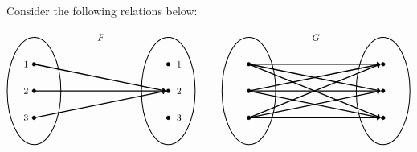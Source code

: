 \documentclass[12pt,letterpaper]{exam}
\begin{document}
\examtitle
{} 
\scores
\bottomline
\newpage

\begin{questions}

\newpage
\question[12] Consider the following relations below:

	\[
	\begin{tikzpicture}
	\node at (2.5,2) {$F$};
	\draw[line width=0.03cm] (0,0) circle (1 and 2);
	\draw[line width=0.03cm] (5,0) circle (1 and 2);
	
	\draw[fill=black] (0,1) circle (0.07);
	\draw[fill=black] (0,0) circle (0.07);
	\draw[fill=black] (0,-1) circle (0.07);
	
	\draw[fill=black] (5,1) circle (0.07);
	\draw[fill=black] (5,0) circle (0.07);
	\draw[fill=black] (5,-1) circle (0.07);
	
	\draw[line width=0.04cm,->] (0,1) -- (4.9,0);
	\draw[line width=0.04cm,->] (0,0) -- (4.9,0);
	\draw[line width=0.04cm,->] (0,-1) -- (4.9,0);
	
	\node at (-0.3,1) {$1$};
	\node at (-0.3,0) {$2$};
	\node at (-0.3,-1) {$3$};
	
	\node at (5.4,1) {$1$};
	\node at (5.4,0) {$2$};
	\node at (5.4,-1) {$3$};
	
	\tikzset{shift={(8,0)}}
	\node at (2.5,2) {$G$};
	\draw[line width=0.03cm] (0,0) circle (1 and 2);
	\draw[line width=0.03cm] (5,0) circle (1 and 2);
	
	\draw[fill=black] (0,1) circle (0.07);
	\draw[fill=black] (0,0) circle (0.07);
	\draw[fill=black] (0,-1) circle (0.07);
	
	\draw[fill=black] (5,1) circle (0.07);
	\draw[fill=black] (5,0) circle (0.07);
	\draw[fill=black] (5,-1) circle (0.07);
	
	\draw[line width=0.04cm,->] (0,1) -- (4.9,1);
	\draw[line width=0.04cm,->] (0,1) -- (4.9,0);
	\draw[line width=0.04cm,->] (0,1) -- (4.9,-1);
	\draw[line width=0.04cm,->] (0,0) -- (4.9,1);
	\draw[line width=0.04cm,->] (0,0) -- (4.9,0);
	\draw[line width=0.04cm,->] (0,0) -- (4.9,-1);
	\draw[line width=0.04cm,->] (0,-1) -- (4.9,1);
	\draw[line width=0.04cm,->] (0,-1) -- (4.9,0);
	\draw[line width=0.04cm,->] (0,-1) -- (4.9,-1);
	

\end{tikzpicture}\]
\end{questions}
\end{document}

